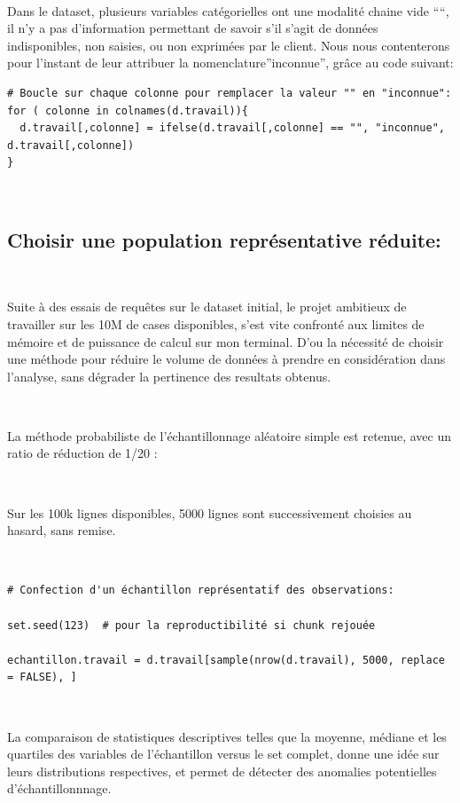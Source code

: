 \documentclass[]{imsart}
\numberwithin{equation}{section}
\theoremstyle{plain}
\begin{document}
~

Dans le dataset, plusieurs variables catégorielles ont une modalité chaine vide ````, il n'y a pas d'information permettant de savoir s'il s'agit de données indisponibles, non saisies, ou non exprimées par le client. Nous nous contenterons pour l'instant de leur attribuer la nomenclature''inconnue'', grâce au code suivant:

\begin{verbatim}
# Boucle sur chaque colonne pour remplacer la valeur "" en "inconnue":
for ( colonne in colnames(d.travail)){
  d.travail[,colonne] = ifelse(d.travail[,colonne] == "", "inconnue", d.travail[,colonne])
}
\end{verbatim}

~

\hypertarget{choisir-une-population-repruxe9sentative-ruxe9duite}{%
\subsection{Choisir une population représentative réduite:}\label{choisir-une-population-repruxe9sentative-ruxe9duite}}

~

Suite à des essais de requêtes sur le dataset initial, le projet ambitieux de travailler sur les 10M de cases disponibles, s'est vite confronté aux limites de mémoire et de puissance de calcul sur mon terminal. D'ou la nécessité de choisir une méthode pour réduire le volume de données à prendre en considération dans l'analyse, sans dégrader la pertinence des resultats obtenus.

~

La méthode probabiliste de l'échantillonnage aléatoire simple est retenue, avec un ratio de réduction de 1/20 :

~

Sur les 100k lignes disponibles, 5000 lignes sont successivement choisies au hasard, sans remise.

~

\begin{verbatim}
# Confection d'un échantillon représentatif des observations:

set.seed(123)  # pour la reproductibilité si chunk rejouée

echantillon.travail = d.travail[sample(nrow(d.travail), 5000, replace = FALSE), ]
\end{verbatim}

~

La comparaison de statistiques descriptives telles que la moyenne, médiane et les quartiles des variables de l'échantillon versus le set complet, donne une idée sur leurs distributions respectives, et permet de détecter des anomalies potentielles d'échantillonnnage.
\end{document}
